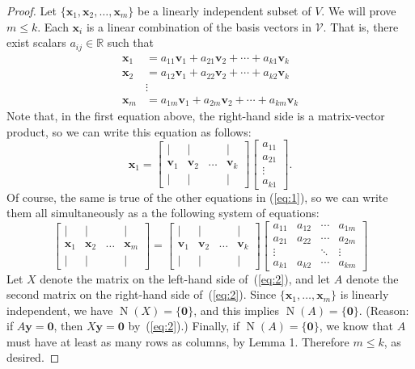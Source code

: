 \documentclass{article}
\newcommand{\R}{\ensuremath{\mathbb{R}}}
\newcommand{\vN}{\ensuremath{\operatorname{N}}}
\newcommand{\sV}{\ensuremath{\mathcal{V}}}
\newcommand{\vx}{\ensuremath{\mathbf{x}}}
\newcommand{\vy}{\ensuremath{\mathbf{y}}}
\newcommand{\vv}{\ensuremath{\mathbf{v}}}
\newcommand{\vzero}{\ensuremath{\mathbf{0}}}
\begin{document}
\begin{proof}
  Let $\{\vx_1, \vx_2, \dots, \vx_m\}$ be a linearly independent subset of $V$.
  We will prove $m\leq k$.
  Each $\vx_i$ is a linear combination of the basis vectors in $\sV$.
  That is, there exist scalars $a_{ij}\in \R$ such that
  \begin{align}
    \label{eq:1}
    \vx_1 &= a_{11}\vv_1+a_{21}\vv_2+\cdots +a_{k1}\vv_k\nonumber\\
    \vx_2 &= a_{12}\vv_1+a_{22}\vv_2+\cdots +a_{k2}\vv_k\\
    &\vdots \nonumber\\
    \vx_m &= a_{1m}\vv_1+a_{2m}\vv_2+\cdots +a_{km}\vv_k\nonumber
  \end{align}
  Note that, in the first equation above, the right-hand side is a matrix-vector
  product, so we can write this equation as follows:
  \[
  \vx_1=
  \begin{bmatrix*}
    | & | & & |\\
    \vv_1& \vv_2 &\hdots & \vv_k\\
    | & | & & |
  \end{bmatrix*}
  \begin{bmatrix*}
    a_{11}\\
    a_{21}\\
    \vdots\\
    a_{k1}
  \end{bmatrix*}.
  \]
  Of course, the same is true of the other equations in (\ref{eq:1}), so we can
  write them all simultaneously as a the following system of equations:
  \begin{equation}
    \label{eq:2}
  \begin{bmatrix*}
    | & | & & |\\
    \vx_1& \vx_2 &\hdots & \vx_m\\
    | & | & & |
  \end{bmatrix*}=
  \begin{bmatrix*}
    | & | & & |\\
    \vv_1& \vv_2 &\hdots & \vv_k\\
    | & | & & |
  \end{bmatrix*}
  \begin{bmatrix*}
    a_{11}  & a_{12} & \cdots &a_{1m}\\
    a_{21}  & a_{22} & \cdots &a_{2m}\\
    \vdots &       & \ddots & \vdots\\
    a_{k1}  & a_{k2} & \cdots & a_{km}
  \end{bmatrix*}
  \end{equation}
  Let $X$ denote the matrix on the left-hand side of~(\ref{eq:2}), and 
  let $A$ denote the second matrix on the right-hand side of~(\ref{eq:2}).
  Since $\{\vx_1, \dots, \vx_m\}$ is linearly independent, we have
  $\vN(X) =\{\vzero\}$, and this implies $\vN(A) =\{\vzero\}$.
  (Reason: if $A \vy = \vzero$, then $X\vy = \vzero$ by~(\ref{eq:2}).)
  Finally, if $\vN(A) =\{\vzero\}$, we know that $A$ must have at least as
  many rows as columns, by Lemma 1.  Therefore $m\leq k$, as desired.
\end{proof}
\end{document}
